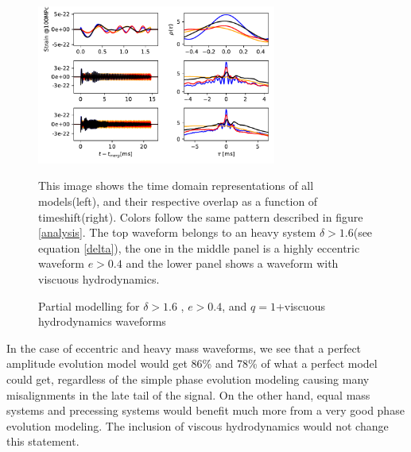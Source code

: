 \begin{figure}[hbt!]
\begin{center}
\includegraphics[width=0.7\textwidth, angle=0]{images/Data_analysis/results/phi-A2.pdf}
\caption{Partial modelling for $\delta>1.6$ , $e>0.4$, and $q=1$+viscuous hydrodynamics waveforms}
\end{center}
This image shows the time domain representations of all models(left), and their respective overlap as a function of timeshift(right). Colors follow the same pattern described in figure \ref{analysis}. The top waveform belongs to an heavy system $\delta>1.6$(see equation \ref{delta}), the one in the middle panel is a highly eccentric waveform $e>0.4$ and the lower panel shows a waveform with viscuous hydrodynamics.
\end{figure}
\FloatBarrier


In the case of eccentric and heavy mass waveforms, we see that a perfect amplitude evolution model would get 86\%  and 78\% of what a perfect model could get, regardless of the simple phase evolution modeling causing many misalignments in the late tail of the signal. On the other hand, equal mass systems and precessing systems would benefit much more from a very good phase evolution modeling. The inclusion of viscous hydrodynamics would not change this statement.


